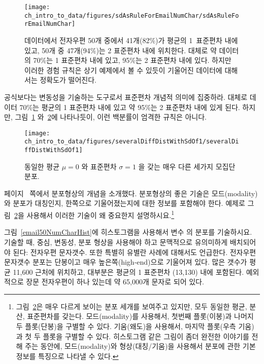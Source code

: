 \begin{figure}
\centering
\texttt{[image: ch\_intro\_to\_data/figures/sdAsRuleForEmailNumChar/sdAsRuleForEmailNumChar]}
\caption{
 데이터에서 전자우편 50개 중에서 41개(82\%)가 평균의 1~표준편차 내에 있고, 50개 중 47개(94\%)는 2 표준편차 내에 위치한다. 대체로 약 데이터의 70\%는 1 표준편차 내에 있고, 95\%는 2 표준편차 내에 있다.
하지만 이러한 경험 규칙은 상기 예제에서 볼 수 있듯이 기울어진 데이터에 대해서는 정확도가 떨어진다.}
\label{sdAsRuleForEmailNumChar}
\end{figure}


\begin{tipBox}{
공식보다는 변동성을 기술하는 도구로서 표준편차 개념적 의미에 집중하라.
대체로 데이터 70\%는 평균의 1 표준편차 내에 있고 약 95\%는 2 표준편차 내에 있게 된다.
하지만, 그림~\ref{sdAsRuleForEmailNumChar} 와~\ref{severalDiffDistWithSdOf1}에 나타나듯이, 
이런 백분률이 엄격한 규칙은 아니다.}
\end{tipBox}


\begin{figure}
\centering
\texttt{[image: ch\_intro\_to\_data/figures/severalDiffDistWithSdOf1/severalDiffDistWithSdOf1]}
\caption{
동일한 평균 $\mu=0$ 와 표준편차  $\sigma=1$ 을 갖는 매우 다른 세가지 모집단 분포.}
\label{severalDiffDistWithSdOf1}
\end{figure}

\begin{exercise}
페이지~\pageref{shapeFirstDiscussed} 쪽에서 분포형상의 개념을 소개했다.
분포형상의 좋은 기술은 모드(modality)와 분포가 대칭인지, 한쪽으로 기울어졌는지에 대한 정보를 포함해야 한다.
예제로 그림~\ref{severalDiffDistWithSdOf1}을 사용해서 이러한 기술이 왜 중요한지 설명하시요.\footnote{
그림~\ref{severalDiffDistWithSdOf1}은 매우 다르게 보이는 분포 세개를 보여주고 있지만, 모두 동일한 평균, 분산, 표준편차를 갖는다.
모드(modality)를 사용해서, 첫번째 플롯(이봉)과 나머지 두 플롯(단봉)을 구별할 수 있다.
기움(왜도)을 사용해서, 마지막 플롯(우측 기움)과 첫 두 플롯을 구별할 수 있다.
히스토그램 같은 그림이 좀더 완전한 이야기를 전해 주는 동안에, 모드(modality)와 형상(대칭/기움)을 사용해서 분포에 관한 기본 정보를 특징으로 나타낼 수 있다.}
\end{exercise}

\begin{example}{
그림~\vref{email50NumCharHist}에 히스토그램을 사용해서 변수 의 분포를 기술하시요.
기술할 때, 중심, 변동성, 분포 형상을 사용해야 하고 문맥적으로 유의미하게 배치되어야 된다: 전자우편 문자갯수. 또한 특별히 유별란 사례에 대해서도 언급한다.}
전자우편 문자갯수 분포는 단봉이고 매우 높은쪽(high-end)으로 기울어져 있다.
많은 갯수가 평균 11,600 근처에 위치하고, 대부분은 평균의 1 표준편차 (13,130) 내에 포함된다.
예외적으로 장문 전자우편이 하나 있는데 약 65,000개 문자로 되어 있다.
\end{example}

